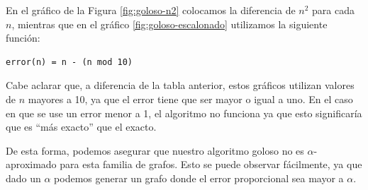 En el gráfico de la Figura \ref{fig:goloso-n2} colocamos la diferencia de $n^2$ para cada $n$, mientras que en el gráfico \ref{fig:goloso-escalonado} utilizamos la siguiente función:
\begin{verbatim}
error(n) = n - (n mod 10)
\end{verbatim}

Cabe aclarar que, a diferencia de la tabla anterior, estos gráficos utilizan valores de $n$ mayores a 10, ya que el error tiene que ser mayor o igual a uno. En el caso en que se use un error menor a 1, el algoritmo no funciona ya que esto significaría que es ``más exacto'' que el exacto.

De esta forma, podemos asegurar que nuestro algoritmo goloso no es $\alpha$-aproximado para esta familia de grafos. Esto se puede observar fácilmente, ya que dado un $\alpha$ podemos generar un grafo donde el error proporcional sea mayor a $\alpha$.
